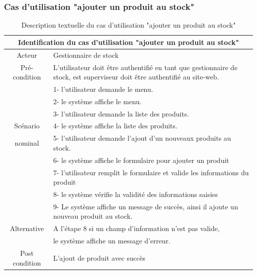 \documentclass[edit,12pt,a4paper,ChapStyle,oneside,doubleinterligne]{report}
\begin{document}
\subsubsection{Cas d'utilisation "ajouter un produit au stock"}
\begin{table}[h!]
    \centering
    \begin{tabular}{|c|m{10cm}|}
        \hline
             \multicolumn{2}{|c|}{Identification du cas d'utilisation "ajouter un produit au stock"}\\
             \hline
             Acteur & Gestionnaire de stock\\
             \hline
             Pré-condition & L'utilisateur doit être authentifié en tant que gestionnaire de stock, est superviseur doit être authentifié au site-web. \\
             \hline
              & 1- l'utilisateur demande le menu.\\
              & 2- le système affiche le menu. \\
              & 3- l'utilisateur demande la liste des produits.\\
              Scénario& 4- le système affiche la liste des produits. \\          
              nominal& 5- l'utilisateur demande l’ajout d’un nouveaux produits au stock.\\
              & 6- le système affiche le formulaire pour ajouter un produit \\
              & 7- l'utilisateur remplit le formulaire et valide les informations du produit \\
              & 8- le système vérifie la validité des informations saisies\\
              & 9- Le système affiche un message de succès, ainsi il ajoute un nouveau produit au stock.\\
             \hline
             Alternative  & A l’étape 8 si un champ d’information n’est pas valide,  \\
             & le système affiche un message d’erreur.\\
             \hline
             Post condition& L’ajout de produit avec succès \\
             \hline
        \end{tabular}
    \caption{Description textuelle du cas d'utilisation "ajouter un produit au stock"}
    \label{tab:cas1}
\end{table}
\end{document}
